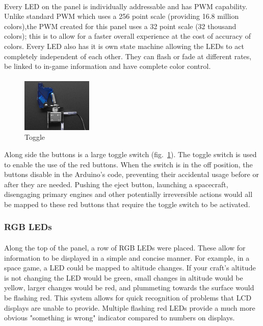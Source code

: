 \documentclass[12pt,a4paper]{article}
\begin{document}
			\paragraph{}
			Every \gls{LED} on the panel is individually addressable and has \gls{PWM} capability.  Unlike standard \gls{PWM} which uses a 256 point scale (providing 16.8 million colors),the \gls{PWM} created for this panel uses a 32 point scale (32 thousand colors); this is to allow for a faster overall experience at the cost of accuracy of colors. Every \gls{LED} also has it is own state machine allowing the \glspl{LED} to act completely independent of each other. They can flash or fade at different rates, be linked to in-game information and have complete color control.
			\paragraph{}
			\begin{figure}
    			\centering
    			\includegraphics[width=0.3\textwidth]{toggle}
    			\caption{Toggle}
    			\label{fig:toggle}
			\end{figure}
			Along side the buttons is a large toggle switch (fig.~\ref{fig:toggle}). The toggle switch is used to enable the use of the red buttons. When the switch is in the off position, the buttons disable in the Arduino's code, preventing their accidental usage before or after they are needed. Pushing the eject button, launching a spacecraft, disengaging primary engines and other potentially irreversible actions would all be mapped to these red buttons that require the toggle switch to be activated.

		\subsubsection{RGB \glspl{LED}}
			\paragraph{}
			Along the top of the panel, a row of \gls{RGB} \glspl{LED} were placed. These allow for information to be displayed in a simple and concise manner. For example, in a space game, a \gls{LED} could be mapped to altitude changes. If your craft's altitude is not changing the \gls{LED} would be green, small changes in altitude would be yellow, larger changes would be red, and plummeting towards the surface would be flashing red. This system allows for quick recognition of problems that \gls{LCD} displays are unable to provide. Multiple flashing red \glspl{LED} provide a much more obvious "something is wrong" indicator compared to numbers on displays.
\end{document}
